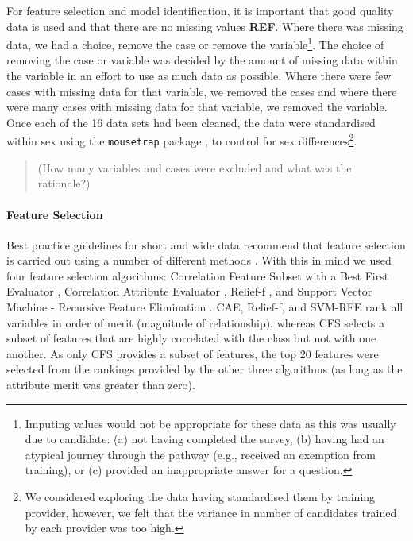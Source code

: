 \documentclass[a4paper,]{book}
\let\oldparagraph\paragraph
\renewcommand{\paragraph}[1]{\oldparagraph{#1}\mbox{}}
\begin{document}
For feature selection and model identification, it is important that good quality data is used and that there are no missing values \textbf{REF}. Where there was missing data, we had a choice, remove the case or remove the variable\footnote{Imputing values would not be appropriate for these data as this was usually due to candidate: (a) not having completed the survey, (b) having had an atypical journey through the pathway (e.g., received an exemption from training), or (c) provided an inappropriate answer for a question.}. The choice of removing the case or variable was decided by the amount of missing data within the variable in an effort to use as much data as possible. Where there were few cases with missing data for that variable, we removed the cases and where there were many cases with missing data for that variable, we removed the variable. Once each of the 16 data sets had been cleaned, the data were standardised within sex using the \texttt{mousetrap} package \citep{R-mousetrap}, to control for sex differences\footnote{We considered exploring the data having standardised them by training provider, however, we felt that the variance in number of candidates trained by each provider was too high.}.

\begin{quote}
(How many variables and cases were excluded and what was the rationale?)
\end{quote}

\hypertarget{feature-selection-1}{%
\paragraph{Feature Selection}\label{feature-selection-1}}

Best practice guidelines for short and wide data recommend that feature selection is carried out using a number of different methods \citep{Jones2017a}. With this in mind we used four feature selection algorithms: Correlation Feature Subset with a Best First Evaluator \citep[CFS;][]{Hall1999}, Correlation Attribute Evaluator \citep[CAE;][]{Bouckaert2018}, Relief-f \citep{Kira1992}, and Support Vector Machine - Recursive Feature Elimination \citep[SVM-RFE;][]{Guyon2002}. CAE, Relief-f, and SVM-RFE rank all variables in order of merit (magnitude of relationship), whereas CFS selects a subset of features that are highly correlated with the class but not with one another. As only CFS provides a subset of features, the top 20 features were selected from the rankings provided by the other three algorithms (as long as the attribute merit was greater than zero).
\end{document}
